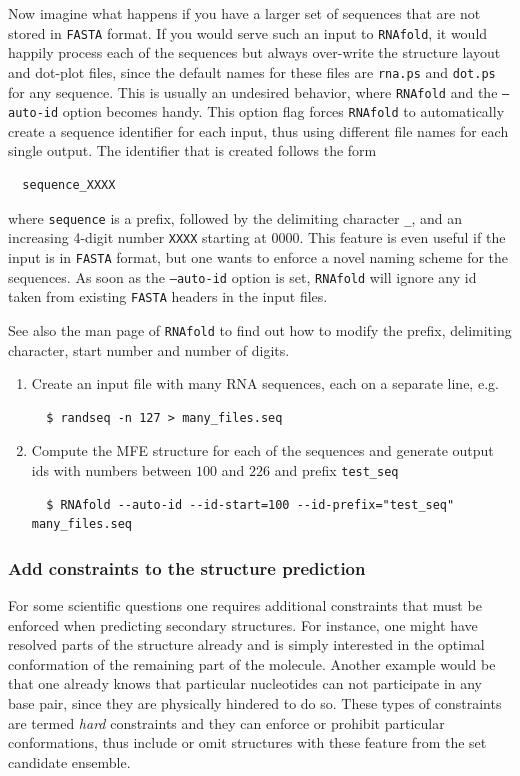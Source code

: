 \documentclass[a4paper]{article}
\begin{document}
Now imagine what happens if you have a larger set of
sequences that are not stored in \texttt{FASTA} format. If you would serve such
an input to \texttt{RNAfold}, it would happily process each of the sequences
but always over-write the structure layout and dot-plot files, since the default
names for these files are \texttt{rna.ps} and \texttt{dot.ps} for any sequence.
This is usually an undesired behavior, where \texttt{RNAfold} and the \texttt{--auto-id}
option becomes handy. This option flag forces \texttt{RNAfold} to automatically
create a sequence identifier for each input, thus using different file names for
each single output. The identifier that is created follows the form
\begin{verbatim}
  sequence_XXXX
\end{verbatim}
where \texttt{sequence} is a prefix, followed by the delimiting character \texttt{\_},
and an increasing 4-digit number \texttt{XXXX} starting at 0000. This feature is
even useful if the input is in \texttt{FASTA} format, but one wants to enforce
a novel naming scheme for the sequences. As soon as the \texttt{--auto-id} option
is set, \texttt{RNAfold} will ignore any id taken from existing \texttt{FASTA}
headers in the input files.

See also the man page of \texttt{RNAfold} to find out how to modify the prefix,
delimiting character, start number and number of digits.

\begin{enumerate}
\item Create an input file with many RNA sequences, each on a separate line, e.g.
\begin{verbatim}
  $ randseq -n 127 > many_files.seq
\end{verbatim}
\item Compute the MFE structure for each of the sequences and generate output
ids with numbers between $100$ and $226$ and prefix \texttt{test\_seq}
\begin{verbatim}
  $ RNAfold --auto-id --id-start=100 --id-prefix="test_seq" many_files.seq
\end{verbatim}
\end{enumerate}

\subsubsection{Add constraints to the structure prediction}
For some scientific questions one requires additional constraints that must be
enforced when predicting secondary structures. For instance, one might have resolved
parts of the structure already and is simply interested in the optimal conformation
of the remaining part of the molecule. Another example would be that one already
knows that particular nucleotides can not participate in any base pair, since they
are physically hindered to do so. These types of constraints are termed \textit{hard}
constraints and they can enforce or prohibit particular conformations, thus include
or omit structures with these feature from the set candidate ensemble.
\end{document}
